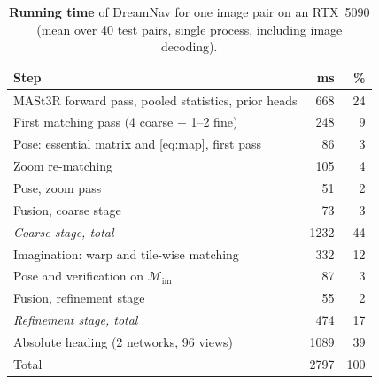 \begin{table}[t]
\centering
\caption{\textbf{Running time} of DreamNav for one image pair on an RTX~5090 (mean over 40 test pairs, single process, including image decoding).}
\label{tab:runtime}
\footnotesize
\setlength{\tabcolsep}{4pt}
\begin{tabular}{@{}lrr@{}}
\toprule
Step & ms & \% \\
\midrule
MASt3R forward pass, pooled statistics, prior heads & 668 & 24 \\
First matching pass (4 coarse + 1--2 fine) & 248 & 9 \\
Pose: essential matrix and \cref{eq:map}, first pass & 86 & 3 \\
Zoom re-matching & 105 & 4 \\
Pose, zoom pass & 51 & 2 \\
Fusion, coarse stage & 73 & 3 \\
\rowcolor{rowgray} \emph{Coarse stage, total} & 1232 & 44 \\
Imagination: warp and tile-wise matching & 332 & 12 \\
Pose and verification on $\mathcal{M}_{\mathrm{im}}$ & 87 & 3 \\
Fusion, refinement stage & 55 & 2 \\
\rowcolor{rowgray} \emph{Refinement stage, total} & 474 & 17 \\
Absolute heading (2 networks, 96 views) & 1089 & 39 \\
\midrule
Total & 2797 & 100 \\
\bottomrule
\end{tabular}
\end{table}
